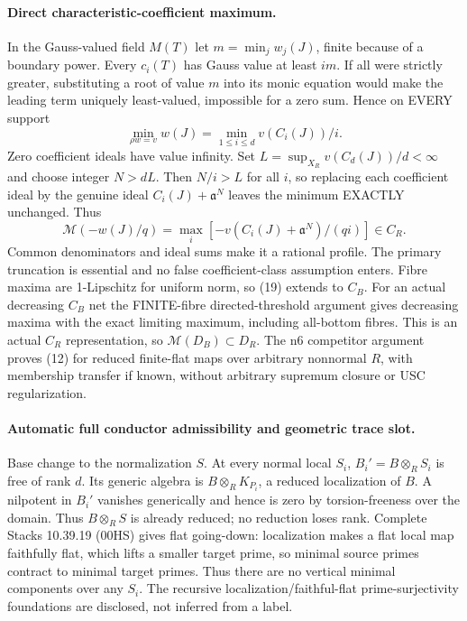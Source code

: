 \paragraph{Direct characteristic-coefficient maximum.}
In the Gauss-valued field $M(T)$ let $m=\min_jw_j(J)$, finite because of a boundary power. Every $c_i(T)$ has Gauss value at least $im$. If all were strictly greater, substituting a root of value $m$ into its monic equation would make the leading term uniquely least-valued, impossible for a zero sum. Hence on EVERY support
\[
 \min_{\rho w=v}w(J)=\min_{1\le i\le d}v(C_i(J))/i. \tag{18}
\]
Zero coefficient ideals have value infinity. Set $L=\sup_{X_R}v(C_d(J))/d<\infty$ and choose integer $N>dL$. Then $N/i>L$ for all $i$, so replacing each coefficient ideal by the genuine ideal $C_i(J)+\mathfrak a^N$ leaves the minimum EXACTLY unchanged. Thus
\[
 \mathcal M(-w(J)/q)
 =\max_i[-v(C_i(J)+\mathfrak a^N)/(qi)]\in C_R. \tag{19}
\]
Common denominators and ideal sums make it a rational profile. The primary truncation is essential and no false coefficient-class assumption enters. Fibre maxima are 1-Lipschitz for uniform norm, so (19) extends to $C_B$. For an actual decreasing $C_B$ net the FINITE-fibre directed-threshold argument gives decreasing maxima with the exact limiting maximum, including all-bottom fibres. This is an actual $C_R$ representation, so $\mathcal M(D_B)\subset D_R$. The n6 competitor argument proves (12) for reduced finite-flat maps over arbitrary nonnormal $R$, with membership transfer if known, without arbitrary supremum closure or USC regularization.

\paragraph{Automatic full conductor admissibility and geometric trace slot.}
Base change to the normalization $S$. At every normal local $S_i$, $B_i'=B\otimes_RS_i$ is free of rank $d$. Its generic algebra is $B\otimes_RK_{P_i}$, a reduced localization of $B$. A nilpotent in $B_i'$ vanishes generically and hence is zero by torsion-freeness over the domain. Thus $B\otimes_RS$ is already reduced; no reduction loses rank. Complete Stacks 10.39.19 (00HS) gives flat going-down: localization makes a flat local map faithfully flat, which lifts a smaller target prime, so minimal source primes contract to minimal target primes. Thus there are no vertical minimal components over any $S_i$. The recursive localization/faithful-flat prime-surjectivity foundations are disclosed, not inferred from a label.

